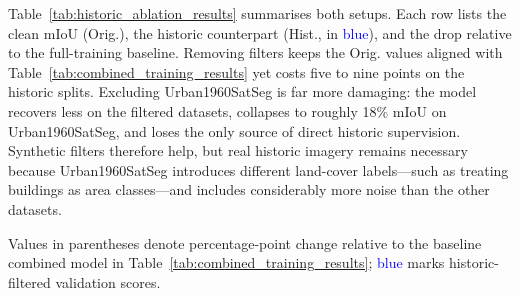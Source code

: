 Table~\ref{tab:historic_ablation_results} summarises both setups. Each row lists the clean mIoU (Orig.), the historic counterpart (Hist., in \textcolor{blue}{blue}), and the drop relative to the full-training baseline. Removing filters keeps the Orig. values aligned with Table~\ref{tab:combined_training_results} yet costs five to nine points on the historic splits. Excluding Urban1960SatSeg is far more damaging: the model recovers less on the filtered datasets, collapses to roughly 18\% mIoU on Urban1960SatSeg, and loses the only source of direct historic supervision. Synthetic filters therefore help, but real historic imagery remains necessary because Urban1960SatSeg introduces different land-cover labels—such as treating buildings as area classes—and includes considerably more noise than the other datasets.
\begin{table}[t]
\centering
\caption{Historic-filter ablations. Each row lists the clean score followed by the historic-filter variant (blue) with percentage-point deltas relative to Table~\ref{tab:combined_training_results}; the second row also removes Urban1960SatSeg supervision.}
\label{tab:historic_ablation_results}
\renewcommand{\arraystretch}{1.1}
\renewcommand{\arraystretch}{1}
\end{table}

Values in parentheses denote percentage-point change relative to the baseline combined model in Table~\ref{tab:combined_training_results}; \textcolor{blue}{blue} marks historic-filtered validation scores.